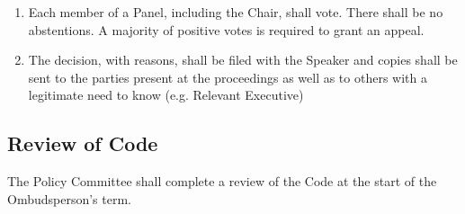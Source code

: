 \begin{enumerate} [align=left]
\begin{enumerate} [label*=\arabic*., align=left]
\begin{enumerate} [label*=\arabic*., align=left]
\item Each party to an oral hearing shall be sent a Notice of Hearing, setting out the time, place, and purpose of the hearing. If a party does not attend, the Panel may proceed in the party's absence.
\end{enumerate}
\item Each member of a Panel, including the Chair, shall vote. There shall be no abstentions. A majority of positive votes is required to grant an appeal.
\item The decision, with reasons, shall be filed with the Speaker and copies shall be sent to the parties present at the proceedings as well as to others with a legitimate need to know (e.g. Relevant Executive)
\end{enumerate}
\end{enumerate}

\subsection{Review of Code}
The Policy Committee shall complete a review of the Code at the start of the Ombudsperson's term.
